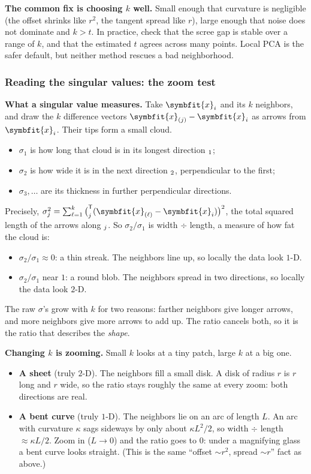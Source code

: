 \documentclass[11pt]{article}
\newcommand{\bm}[1]{\symbfit{#1}}
\newcommand{\vx}{\bm{x}}
\let\vv\relax\newcommand{\vv}{\bm{v}}
\newcommand{\T}{^{\mathsf T}}
\begin{document}
\begin{careful}
\textbf{The common fix is choosing $k$ well.} Small enough that curvature is negligible (the offset shrinks like $r^2$, the tangent
spread like $r$), large enough that noise does not dominate and $k>t$. In practice, check that the scree gap is stable over a
range of $k$, and that the estimated $t$ agrees across many points. Local PCA is the safer default, but neither method
rescues a bad neighborhood.
\end{careful}

\subsubsection*{Reading the singular values: the zoom test}

\textbf{What a singular value measures.} Take $\vx_i$ and its $k$ neighbors, and draw the $k$ difference vectors
$\vx_{(j)}-\vx_i$ as arrows from $\vx_i$. Their tips form a small cloud.
\begin{itemize}[nosep]
\item $\sigma_1$ is how long that cloud is in its longest direction $\vv_1$;
\item $\sigma_2$ is how wide it is in the next direction $\vv_2$, perpendicular to the first;
\item $\sigma_3,\dots$ are its thickness in further perpendicular directions.
\end{itemize}
Precisely, $\sigma_j^2=\sum_{\ell=1}^k\big(\vv_j\T(\vx_{(\ell)}-\vx_i)\big)^2$, the total squared length of the arrows along $\vv_j$.
So $\sigma_2/\sigma_1$ is width $\div$ length, a measure of how fat the cloud is:
\begin{itemize}[nosep]
\item $\sigma_2/\sigma_1\approx0$: a thin streak. The neighbors line up, so locally the data look $1$-D.
\item $\sigma_2/\sigma_1$ near $1$: a round blob. The neighbors spread in two directions, so locally the data look $2$-D.
\end{itemize}
The raw $\sigma$'s grow with $k$ for two reasons: farther neighbors give longer arrows, and more neighbors give more
arrows to add up. The ratio cancels both, so it is the ratio that describes the \emph{shape}.

\textbf{Changing $k$ is zooming.} Small $k$ looks at a tiny patch, large $k$ at a big one.
\begin{itemize}[nosep]
\item \textbf{A sheet} (truly $2$-D). The neighbors fill a small disk. A disk of radius $r$ is $r$ long and $r$ wide, so the ratio stays
roughly the same at every zoom: both directions are real.
\item \textbf{A bent curve} (truly $1$-D). The neighbors lie on an arc of length $L$. An arc with curvature $\kappa$ sags sideways by only about
$\kappa L^2/2$, so width $\div$ length $\approx\kappa L/2$. Zoom in ($L\to0$) and the ratio goes to $0$: under a magnifying glass a bent
curve looks straight. (This is the same ``offset $\sim r^2$, spread $\sim r$'' fact as above.)
\end{itemize}
\end{document}

